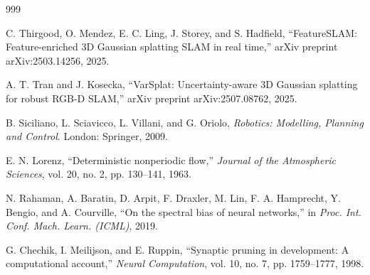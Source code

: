 \documentclass[12pt,a4paper,oneside]{report}
\begin{document}
\begin{thebibliography}{999}

C. Thirgood, O. Mendez, E. C. Ling, J. Storey, and S. Hadfield, ``{FeatureSLAM}: Feature-enriched {3D} Gaussian splatting {SLAM} in real time,'' arXiv preprint arXiv:2503.14256, 2025.




A. T. Tran and J. Kosecka, ``{VarSplat}: Uncertainty-aware {3D} Gaussian splatting for robust {RGB-D} {SLAM},'' arXiv preprint arXiv:2507.08762, 2025.




B. Siciliano, L. Sciavicco, L. Villani, and G. Oriolo, \textit{Robotics: Modelling, Planning and Control}. London: Springer, 2009.




E. N. Lorenz, ``Deterministic nonperiodic flow,'' \textit{Journal of the Atmospheric Sciences}, vol. 20, no. 2, pp. 130--141, 1963.




N. Rahaman, A. Baratin, D. Arpit, F. Draxler, M. Lin, F. A. Hamprecht, Y. Bengio, and A. Courville, ``On the spectral bias of neural networks,'' in \textit{Proc. Int. Conf. Mach. Learn. (ICML)}, 2019.




G. Chechik, I. Meilijson, and E. Ruppin, ``Synaptic pruning in development: A computational account,'' \textit{Neural Computation}, vol. 10, no. 7, pp. 1759--1777, 1998.



\end{thebibliography}
\end{document}
